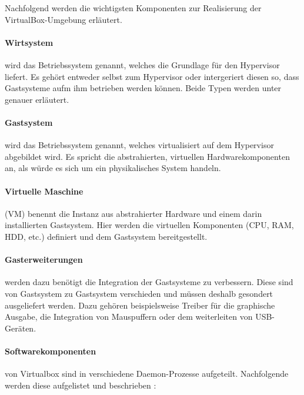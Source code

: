 Nachfolgend werden die wichtigsten Komponenten zur Realisierung der VirtualBox-Umgebung
erläutert.

\paragraph{Wirtsystem} wird das Betriebssystem genannt, welches die Grundlage für den Hypervisor
liefert. Es gehört entweder selbst zum Hypervisor oder intergeriert diesen so, dass Gastsysteme
aufm ihm betrieben werden können. Beide Typen werden unter  genauer
erläutert.

\paragraph{Gastsystem} wird das Betriebssystem genannt, welches virtualisiert auf dem Hypervisor
abgebildet wird. Es spricht die abstrahierten, virtuellen Hardwarekomponenten an, als würde
es sich um ein physikalisches System handeln.

\paragraph{Virtuelle Maschine} (VM) benennt die Instanz aus abstrahierter Hardware und einem
darin installierten Gastsystem. Hier werden die virtuellen Komponenten (CPU, RAM, HDD, etc.)
definiert und dem Gastsystem bereitgestellt.

\paragraph{Gasterweiterungen} werden dazu benötigt die Integration der Gastsysteme zu verbessern.
Diese sind von Gastsystem zu Gastsystem verschieden und müssen deshalb gesondert ausgeliefert werden.
Dazu gehören beispielsweise Treiber für die graphische Ausgabe, die Integration von Mauspuffern
oder dem weiterleiten von USB-Geräten.

\paragraph{Softwarekomponenten} von Virtualbox sind in verschiedene Daemon-Prozesse aufgeteilt.
Nachfolgende werden diese aufgelistet und beschrieben \cite{victor10}: %


